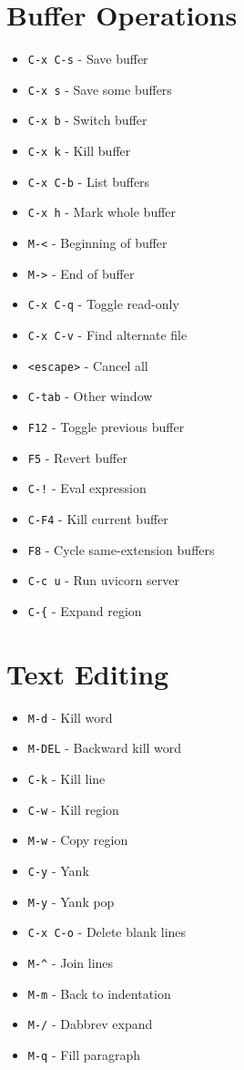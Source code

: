 \documentclass[6pt,landscape]{article}
\newcommand{\key}[1]{\texttt{#1}}
\begin{document}
\begin{multicols*}{5}
\section*{Buffer Operations}
\begin{itemize}[leftmargin=*,itemsep=0pt,parsep=0pt,topsep=0pt]
\item \key{C-x C-s} - Save buffer
\item \key{C-x s} - Save some buffers
\item \key{C-x b} - Switch buffer
\item \key{C-x k} - Kill buffer
\item \key{C-x C-b} - List buffers
\item \key{C-x h} - Mark whole buffer
\item \key{M-<} - Beginning of buffer
\item \key{M->} - End of buffer
\item \key{C-x C-q} - Toggle read-only
\item \key{C-x C-v} - Find alternate file
\item \key{<escape>} - Cancel all
\item \key{C-tab} - Other window
\item \key{F12} - Toggle previous buffer
\item \key{F5} - Revert buffer
\item \key{C-!} - Eval expression
\item \key{C-F4} - Kill current buffer
\item \key{F8} - Cycle same-extension buffers
\item \key{C-c u} - Run uvicorn server
\item \key{C-\{} - Expand region
\end{itemize}

\section*{Text Editing}
\begin{itemize}[leftmargin=*,itemsep=0pt,parsep=0pt,topsep=0pt]
\item \key{M-d} - Kill word
\item \key{M-DEL} - Backward kill word
\item \key{C-k} - Kill line
\item \key{C-w} - Kill region
\item \key{M-w} - Copy region
\item \key{C-y} - Yank
\item \key{M-y} - Yank pop
\item \key{C-x C-o} - Delete blank lines
\item \key{M-\textasciicircum} - Join lines
\item \key{M-m} - Back to indentation
\item \key{M-/} - Dabbrev expand
\item \key{M-q} - Fill paragraph
\end{itemize}


\end{multicols*}
\end{document}
